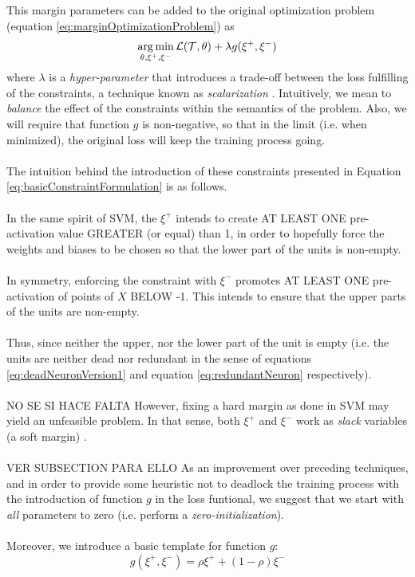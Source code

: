 This margin parameters can be added to the original optimization problem  (equation \ref{eq:marginOptimizationProblem}) as
\begin{equation}\label{eq:marginOptimizationProblem}
\operatorname*{arg\,min}_{\theta,\xi^{+},\xi^{-}} \mathcal{L}(\mathcal{T},\theta) + \lambda g(\xi^{+},\xi^{-})
\end{equation}
where $\lambda$ is a \emph{hyper-parameter} that introduces a trade-off between the loss fulfilling of the constraints, a technique known as \emph{scalarization} \cite{boyd}. Intuitively, we mean to \emph{balance} the effect of the constraints within the semantics of the problem.
Also, we will require that function $g$ is non-negative, so that in the limit (i.e. when minimized), the original loss will keep the training process going. 
\\\\
The intuition behind the introduction of these constraints presented in Equation \ref{eq:basicConstraintFormulation} is as follows. 
\\\\
In the same spirit of SVM, the $\xi^{+}$ intends to create AT LEAST ONE pre-activation value GREATER (or equal) than 1, in order to  hopefully force the weights and biases to be chosen so that the lower part of the units is non-empty. 
\\\\
In symmetry, enforcing the constraint with $\xi^{-}$ promotes AT LEAST ONE pre-activation of points of $X$ BELOW -1. This intends to ensure that the upper parts of the units are non-empty. 
\\\\
Thus, since neither the upper, nor the lower part of the unit is empty (i.e. the units are neither dead nor redundant in the sense of equations \ref{eq:deadNeuronVersion1} and equation \ref{eq:redundantNeuron} respectively).
\\\\
NO SE SI HACE FALTA However, fixing a hard margin as done in SVM may yield an unfeasible problem. In that sense, both $\xi^{+}$ and $\xi^{-}$ work as \emph{slack} variables (a soft margin) \cite{Burges1998TutorialOnSVMForPatternRecognition,Hearst1998SupportVectorMachines}.
\\\\
VER SUBSECTION PARA ELLO As an improvement over preceding techniques, and in order to provide some heuristic not to deadlock the training process with the introduction of function $g$ in the loss funtional, we suggest that we start with \emph{all} parameters to zero (i.e. perform a \emph{zero-initialization}). 
\\\\
Moreover, we introduce a basic template for function $g$:
\begin{equation}\label{eq:definitionOfRho}
    g(\xi^{+},\xi^{-}) = \rho\xi^{+}+(1-\rho)\xi^{-}
\end{equation}

